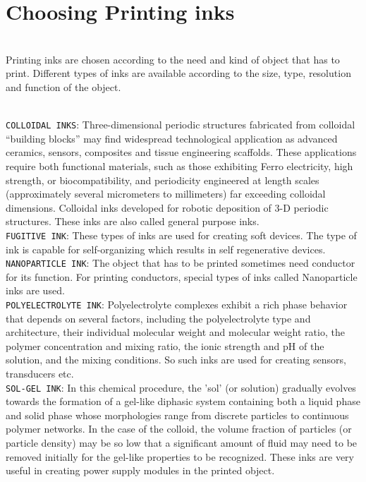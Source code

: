 \documentclass[12pt,a4paper]{report}
\begin{document}
	\section{Choosing Printing inks}
	\indent
	\\Printing inks are chosen according to the need and kind of object that has to print. Different
	types of inks are available according to the size, type, resolution and function of the object.\par
	\indent
	\\\texttt{COLLOIDAL INKS}: Three-dimensional periodic structures fabricated from colloidal “building
	blocks” may find widespread technological application as advanced ceramics, sensors, composites
	and tissue engineering scaffolds. These applications require both functional materials, such as those
	exhibiting Ferro electricity, high strength, or biocompatibility, and periodicity engineered at length
	scales (approximately several micrometers to millimeters) far exceeding colloidal dimensions.
	Colloidal inks developed for robotic deposition of 3-D periodic structures. These inks are also
	called general purpose inks.\\
	\texttt{FUGITIVE INK}: These types of inks are used for creating soft devices. The type of ink is capable
	for self-organizing which results in self regenerative devices.\\
	\texttt{NANOPARTICLE INK}: The object that has to be printed sometimes need conductor for its
	function. For printing conductors, special types of inks called Nanoparticle inks are used.\\
	\texttt{POLYELECTROLYTE INK}: Polyelectrolyte complexes exhibit a rich phase behavior that
	depends on several factors, including the polyelectrolyte type and architecture, their individual
	molecular weight and molecular weight ratio, the polymer concentration and mixing ratio, the ionic
	strength and pH of the solution, and the mixing conditions. So such inks are used for creating
	sensors, transducers etc.\\
	\texttt{SOL-GEL INK}: In this chemical procedure, the 'sol' (or solution) gradually evolves towards the
	formation of a gel-like diphasic system containing both a liquid phase and solid phase whose
	morphologies range from discrete particles to continuous polymer networks. In the case of the
	colloid, the volume fraction of particles (or particle density) may be so low that a significant
	amount of fluid may need to be removed initially for the gel-like properties to be recognized. These
	inks are very useful in creating power supply modules in the printed object.\par
\end{document}
